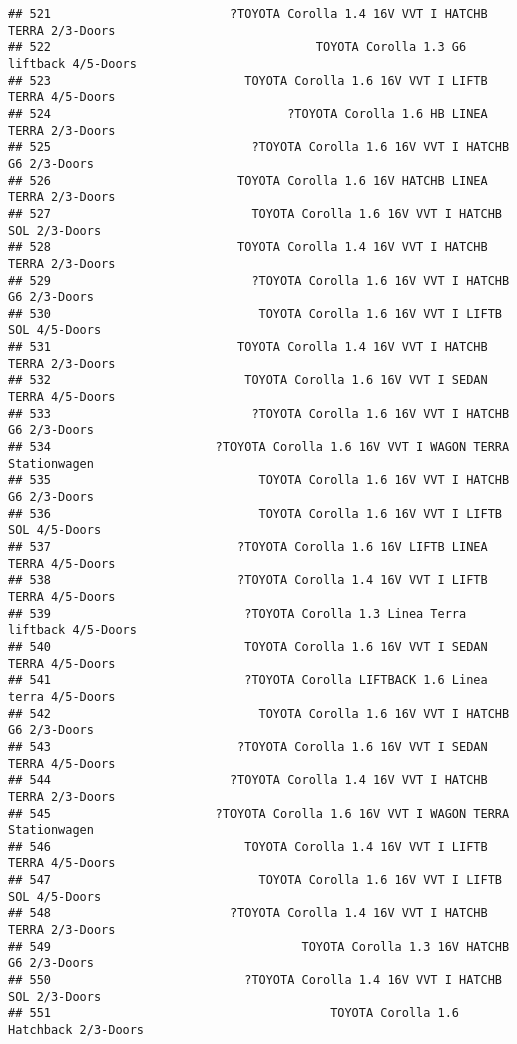 \documentclass[]{article}
\begin{document}
\begin{verbatim}
## 521                         ?TOYOTA Corolla 1.4 16V VVT I HATCHB TERRA 2/3-Doors
## 522                                     TOYOTA Corolla 1.3 G6 liftback 4/5-Doors
## 523                           TOYOTA Corolla 1.6 16V VVT I LIFTB TERRA 4/5-Doors
## 524                                 ?TOYOTA Corolla 1.6 HB LINEA TERRA 2/3-Doors
## 525                            ?TOYOTA Corolla 1.6 16V VVT I HATCHB G6 2/3-Doors
## 526                          TOYOTA Corolla 1.6 16V HATCHB LINEA TERRA 2/3-Doors
## 527                            TOYOTA Corolla 1.6 16V VVT I HATCHB SOL 2/3-Doors
## 528                          TOYOTA Corolla 1.4 16V VVT I HATCHB TERRA 2/3-Doors
## 529                            ?TOYOTA Corolla 1.6 16V VVT I HATCHB G6 2/3-Doors
## 530                             TOYOTA Corolla 1.6 16V VVT I LIFTB SOL 4/5-Doors
## 531                          TOYOTA Corolla 1.4 16V VVT I HATCHB TERRA 2/3-Doors
## 532                           TOYOTA Corolla 1.6 16V VVT I SEDAN TERRA 4/5-Doors
## 533                            ?TOYOTA Corolla 1.6 16V VVT I HATCHB G6 2/3-Doors
## 534                       ?TOYOTA Corolla 1.6 16V VVT I WAGON TERRA Stationwagen
## 535                             TOYOTA Corolla 1.6 16V VVT I HATCHB G6 2/3-Doors
## 536                             TOYOTA Corolla 1.6 16V VVT I LIFTB SOL 4/5-Doors
## 537                          ?TOYOTA Corolla 1.6 16V LIFTB LINEA TERRA 4/5-Doors
## 538                          ?TOYOTA Corolla 1.4 16V VVT I LIFTB TERRA 4/5-Doors
## 539                           ?TOYOTA Corolla 1.3 Linea Terra liftback 4/5-Doors
## 540                           TOYOTA Corolla 1.6 16V VVT I SEDAN TERRA 4/5-Doors
## 541                           ?TOYOTA Corolla LIFTBACK 1.6 Linea terra 4/5-Doors
## 542                             TOYOTA Corolla 1.6 16V VVT I HATCHB G6 2/3-Doors
## 543                          ?TOYOTA Corolla 1.6 16V VVT I SEDAN TERRA 4/5-Doors
## 544                         ?TOYOTA Corolla 1.4 16V VVT I HATCHB TERRA 2/3-Doors
## 545                       ?TOYOTA Corolla 1.6 16V VVT I WAGON TERRA Stationwagen
## 546                           TOYOTA Corolla 1.4 16V VVT I LIFTB TERRA 4/5-Doors
## 547                             TOYOTA Corolla 1.6 16V VVT I LIFTB SOL 4/5-Doors
## 548                         ?TOYOTA Corolla 1.4 16V VVT I HATCHB TERRA 2/3-Doors
## 549                                   TOYOTA Corolla 1.3 16V HATCHB G6 2/3-Doors
## 550                           ?TOYOTA Corolla 1.4 16V VVT I HATCHB SOL 2/3-Doors
## 551                                       TOYOTA Corolla 1.6 Hatchback 2/3-Doors

\end{verbatim}
\end{document}
